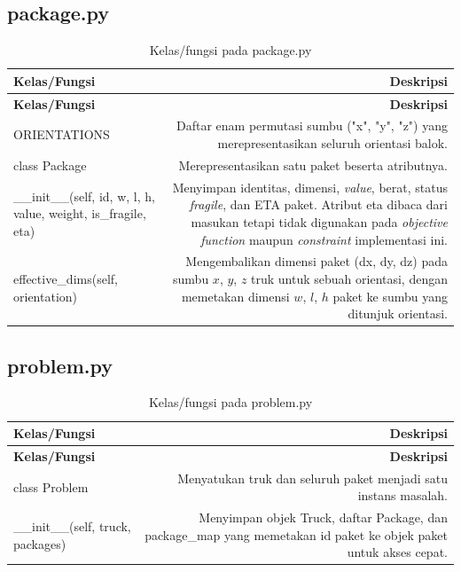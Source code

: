 
\subsection{package.py}

\begin{longtable}{|K|D|}
\caption{Kelas/fungsi pada package.py}
\label{tab:package} \\
\hline
\textbf{Kelas/Fungsi} & \textbf{Deskripsi} \\
\hline
\endfirsthead
\hline
\textbf{Kelas/Fungsi} & \textbf{Deskripsi} \\
\hline
\endhead
\hline
\endlastfoot
ORIENTATIONS & Daftar enam permutasi sumbu ("x", "y", "z") yang merepresentasikan seluruh orientasi balok. \\ \hline
class Package & Merepresentasikan satu paket beserta atributnya. \\ \hline
\_\_init\_\_(self, id, w, l, h, value, weight, is\_fragile, eta) & Menyimpan identitas, dimensi, \textit{value}, berat, status \textit{fragile}, dan ETA paket. Atribut eta dibaca dari masukan tetapi tidak digunakan pada \textit{objective function} maupun \textit{constraint} implementasi ini. \\ \hline
effective\_dims(self, orientation) & Mengembalikan dimensi paket (dx, dy, dz) pada sumbu $x$, $y$, $z$ truk untuk sebuah orientasi, dengan memetakan dimensi $w$, $l$, $h$ paket ke sumbu yang ditunjuk orientasi. \\ \hline
\end{longtable}


\subsection{problem.py}

\begin{longtable}{|K|D|}
\caption{Kelas/fungsi pada problem.py}
\label{tab:problem} \\
\hline
\textbf{Kelas/Fungsi} & \textbf{Deskripsi} \\
\hline
\endfirsthead
\hline
\textbf{Kelas/Fungsi} & \textbf{Deskripsi} \\
\hline
\endhead
\hline
\endlastfoot
class Problem & Menyatukan truk dan seluruh paket menjadi satu instans masalah. \\ \hline
\_\_init\_\_(self, truck, packages) & Menyimpan objek Truck, daftar Package, dan package\_map yang memetakan id paket ke objek paket untuk akses cepat. \\ \hline
\end{longtable}

